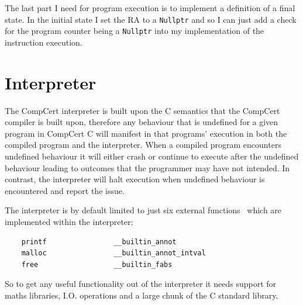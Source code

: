 

The last part I need for program execution is to implement a definition of a final state. In the initial state I set the RA to a \texttt{Nullptr} and so I can just add a check for the program counter being a \texttt{Nullptr} into my implementation of the instruction execution.

\section{Interpreter}
The CompCert interpreter is built upon the C semantics that the CompCert compiler is built upon, therefore any behaviour that is undefined for a given program in CompCert C will manifest in that programs' execution in both the compiled program and the interpreter. When a compiled program encounters undefined behaviour it will either crash or continue to execute after the undefined behaviour leading to outcomes that the programmer may have not intended. In contrast, the interpreter will halt execution when undefined behaviour is encountered and report the issue. 

The interpreter is by default limited to just six external functions~\cite{interpreter-manual} which are implemented within the interpreter:
\begin{verbatim}
    printf                __builtin_annot
    malloc                __builtin_annot_intval
    free                  __builtin_fabs
\end{verbatim}

So to get any useful functionality out of the interpreter it needs support for maths libraries, I.O. operations and a large chunk of the C standard library.

